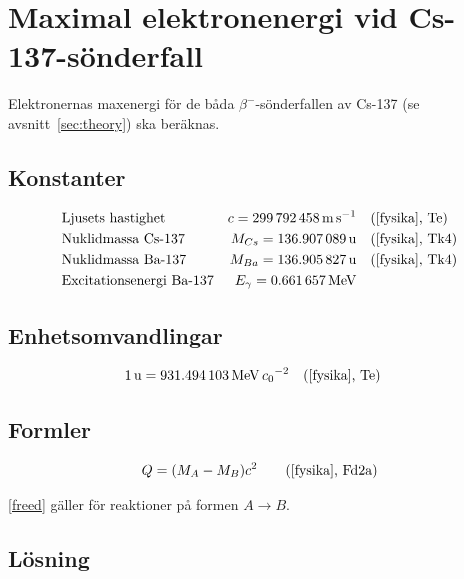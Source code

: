 \section{Maximal elektronenergi vid Cs-137-sönderfall} \label{sec:energy}

Elektronernas maxenergi för de båda $\beta^-$-sönderfallen av Cs-137 (se
avsnitt~\ref{sec:theory}) ska beräknas.

\subsection*{Konstanter}

\begin{align*}
    & \text{Ljusets hastighet}        & c        = \qty{299792458}{\m\per\s}         &\quad \fysika{Te}     \\
    & \text{Nuklidmassa Cs-137}       & M_{Cs}   = \qty{136.907089}{\atomicmassunit} &\quad \fysika{Tk4}    \\
    & \text{Nuklidmassa Ba-137}       & M_{Ba}   = \qty{136.905827}{\atomicmassunit} &\quad \fysika{Tk4}    \\
    & \text{Excitationsenergi Ba-137} & E_\gamma = \qty{0.661657}{\MeV}
\end{align*}

\subsection*{Enhetsomvandlingar}

\begin{align*}
    & \qty{1}{\atomicmassunit} = \qty{931.494103}{\MeV\per\clight\squared} \quad \fysika{Te}
\end{align*}

\subsection*{Formler}

\begin{align}
    Q &= (M_A - M_B)c^2 &\quad \fysika{Fd2a} \label{freed}
\end{align}

\eqref{freed} gäller för reaktioner på formen $A \longrightarrow B$.

\subsection*{Lösning}

